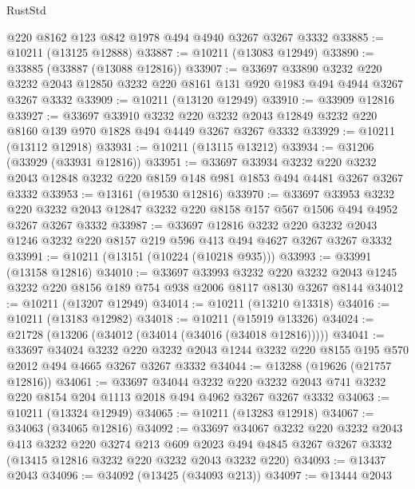 \begin{lexlean}{RustStd}
\begin{coremodule}
    @220
    @8162
    @123
    @842
    @1978
    @494
    @4940
    @3267
    @3267
    @3332
@33885 := @10211 (@13125 @12888)
@33887 := @10211 (@13083 @12949)
@33890 := @33885 (@33887 (@13088 @12816))
@33907 := @33697
    @33890
    @3232
    @220
    @3232
    @2043
    @12850
    @3232
    @220
    @8161
    @131
    @920
    @1983
    @494
    @4944
    @3267
    @3267
    @3332
@33909 := @10211 (@13120 @12949)
@33910 := @33909 @12816
@33927 := @33697
    @33910
    @3232
    @220
    @3232
    @2043
    @12849
    @3232
    @220
    @8160
    @139
    @970
    @1828
    @494
    @4449
    @3267
    @3267
    @3332
@33929 := @10211 (@13112 @12918)
@33931 := @10211 (@13115 @13212)
@33934 := @31206 (@33929 (@33931 @12816))
@33951 := @33697
    @33934
    @3232
    @220
    @3232
    @2043
    @12848
    @3232
    @220
    @8159
    @148
    @981
    @1853
    @494
    @4481
    @3267
    @3267
    @3332
@33953 := @13161 (@19530 @12816)
@33970 := @33697
    @33953
    @3232
    @220
    @3232
    @2043
    @12847
    @3232
    @220
    @8158
    @157
    @567
    @1506
    @494
    @4952
    @3267
    @3267
    @3332
@33987 := @33697
    @12816
    @3232
    @220
    @3232
    @2043
    @1246
    @3232
    @220
    @8157
    @219
    @596
    @413
    @494
    @4627
    @3267
    @3267
    @3332
@33991 := @10211 (@13151 (@10224 (@10218 @935)))
@33993 := @33991 (@13158 @12816)
@34010 := @33697
    @33993
    @3232
    @220
    @3232
    @2043
    @1245
    @3232
    @220
    @8156
    @189
    @754
    @938
    @2006
    @8117
    @8130
    @3267
    @8144
@34012 := @10211 (@13207 @12949)
@34014 := @10211 (@13210 @13318)
@34016 := @10211 (@13183 @12982)
@34018 := @10211 (@15919 @13326)
@34024 := @21728 (@13206 (@34012 (@34014 (@34016 (@34018 @12816)))))
@34041 := @33697
    @34024
    @3232
    @220
    @3232
    @2043
    @1244
    @3232
    @220
    @8155
    @195
    @570
    @2012
    @494
    @4665
    @3267
    @3267
    @3332
@34044 := @13288 (@19626 (@21757 @12816))
@34061 := @33697
    @34044
    @3232
    @220
    @3232
    @2043
    @741
    @3232
    @220
    @8154
    @204
    @1113
    @2018
    @494
    @4962
    @3267
    @3267
    @3332
@34063 := @10211 (@13324 @12949)
@34065 := @10211 (@13283 @12918)
@34067 := @34063 (@34065 @12816)
@34092 := @33697
    @34067
    @3232
    @220
    @3232
    @2043
    @413
    @3232
    @220
    @3274
    @213
    @609
    @2023
    @494
    @4845
    @3267
    @3267
    @3332
    (@13415 @12816 @3232 @220 @3232 @2043 @3232 @220)
@34093 := @13437 @2043
@34096 := @34092 (@13425 (@34093 @213))
@34097 := @13444 @2043

\end{coremodule}
\end{lexlean}
